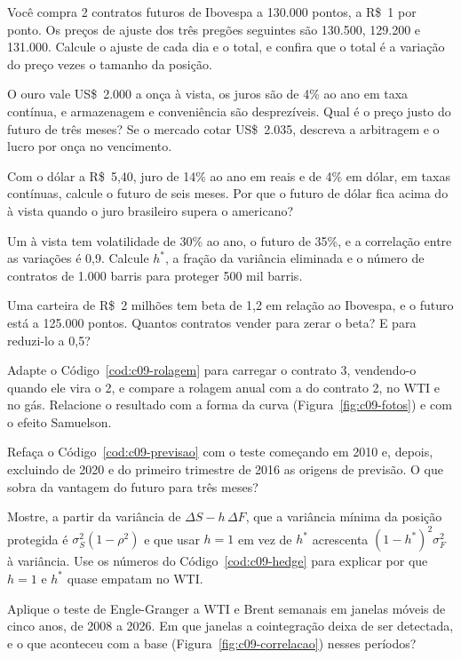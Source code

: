 \begin{exercicios}
  \item {} Você compra 2 contratos futuros de Ibovespa a 130.000 pontos, a R\$~1 por ponto. Os preços de ajuste dos três pregões seguintes são 130.500, 129.200 e 131.000. Calcule o ajuste de cada dia e o total, e confira que o total é a variação do preço vezes o tamanho da posição.
  \item {} O ouro vale US\$~2.000 a onça à vista, os juros são de 4\% ao ano em taxa contínua, e armazenagem e conveniência são desprezíveis. Qual é o preço justo do futuro de três meses? Se o mercado cotar US\$~2.035, descreva a arbitragem e o lucro por onça no vencimento.
  \item {} Com o dólar a R\$~5,40, juro de 14\% ao ano em reais e de 4\% em dólar, em taxas contínuas, calcule o futuro de seis meses. Por que o futuro de dólar fica acima do à vista quando o juro brasileiro supera o americano?
  \item {} Um à vista tem volatilidade de 30\% ao ano, o futuro de 35\%, e a correlação entre as variações é 0,9. Calcule $h^{\ast}$, a fração da variância eliminada e o número de contratos de 1.000 barris para proteger 500 mil barris.
  \item {} Uma carteira de R\$~2 milhões tem beta de 1,2 em relação ao Ibovespa, e o futuro está a 125.000 pontos. Quantos contratos vender para zerar o beta? E para reduzi-lo a 0,5?
  \item {} Adapte o Código~\ref{cod:c09-rolagem} para carregar o contrato 3, vendendo-o quando ele vira o 2, e compare a rolagem anual com a do contrato 2, no WTI e no gás. Relacione o resultado com a forma da curva (Figura~\ref{fig:c09-fotos}) e com o efeito Samuelson.
  \item {} Refaça o Código~\ref{cod:c09-previsao} com o teste começando em 2010 e, depois, excluindo de 2020 e do primeiro trimestre de 2016 as origens de previsão. O que sobra da vantagem do futuro para três meses?
  \item {} Mostre, a partir da variância de $\Delta S - h\,\Delta F$, que a variância mínima da posição protegida é $\sigma_S^2(1-\rho^2)$ e que usar $h = 1$ em vez de $h^{\ast}$ acrescenta $(1-h^{\ast})^2\sigma_F^2$ à variância. Use os números do Código~\ref{cod:c09-hedge} para explicar por que $h = 1$ e $h^{\ast}$ quase empatam no WTI.
  \item {} Aplique o teste de Engle-Granger a WTI e Brent semanais em janelas móveis de cinco anos, de 2008 a 2026. Em que janelas a cointegração deixa de ser detectada, e o que aconteceu com a base (Figura~\ref{fig:c09-correlacao}) nesses períodos?
\end{exercicios}

